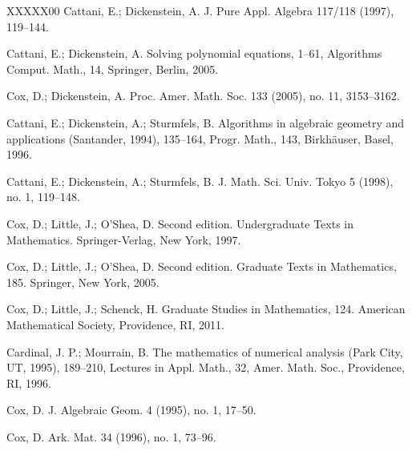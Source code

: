 \documentclass[a4paper,11pt]{amsart}
\newcounter{thm}
\numberwithin{thm}{section}
\numberwithin{equation}{section}
\theoremstyle{definition}
\theoremstyle{plain}
\begin{document}
\begin{thebibliography}{XXXXX00}
Cattani, E.; Dickenstein, A.
J. Pure Appl. Algebra 117/118 (1997), 119--144. 

Cattani, E.; Dickenstein, A.
\newblock Solving polynomial equations, 1--61, Algorithms Comput. Math., 14, Springer, Berlin, 2005. 

Cox, D.; Dickenstein, A.
\newblock Proc. Amer. Math. Soc. 133 (2005), no. 11, 3153--3162.

Cattani, E.; Dickenstein, A.; Sturmfels, B.
\newblock Algorithms in algebraic geometry and applications (Santander, 1994), 135--164,
Progr. Math., 143, Birkh\"auser, Basel, 1996. 


Cattani, E.; Dickenstein, A.; Sturmfels, B.
\newblock J. Math. Sci. Univ. Tokyo 5 (1998), no. 1, 119--148. 

Cox, D.; Little, J.; O'Shea, D.
Second edition. Undergraduate Texts in Mathematics. Springer-Verlag, New York, 1997.

Cox, D.; Little, J.; O'Shea, D.
 Second edition. 
\newblock Graduate Texts in Mathematics, 185. Springer, New York, 2005.

Cox, D.; Little, J.; Schenck, H. 
 Graduate Studies in Mathematics, 124. 
\newblock American Mathematical Society, Providence, RI, 2011.


Cardinal, J. P.; Mourrain, B. 
\newblock The mathematics of numerical analysis (Park City, UT, 1995), 189--210, Lectures in Appl. Math., 32, Amer. Math. Soc., Providence, RI, 1996.



Cox, D. 
\newblock J. Algebraic Geom. 4 (1995), no. 1, 17--50. 

Cox, D. 
\newblock Ark. Mat. 34 (1996), no. 1, 73--96. 



\end{thebibliography}
\end{document}
